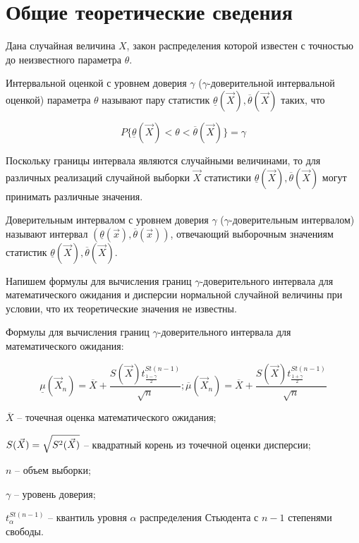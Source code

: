 \documentclass[12pt]{report}
\begin{document}
\clearpage

\chapter*{Общие теоретические сведения}

Дана случайная величина $X$, закон распределения которой известен с точностью до неизвестного параметра $\theta$.

Интервальной оценкой с уровнем доверия $\gamma$ ($\gamma$-доверительной интервальной оценкой) параметра $\theta$ называют пару статистик $\underline{\theta}(\vec X), \overline{\theta}(\vec X)$ таких, что

\begin{equation*}
	P\{\underline{\theta}(\vec X)<\theta<\overline{\theta}(\vec X)\}=\gamma
\end{equation*}

Поскольку границы интервала являются случайными величинами, то для различных реализаций случайной выборки $\vec X$ статистики $\underline{\theta}(\vec X), \overline{\theta}(\vec X)$ могут принимать различные значения.

Доверительным интервалом с уровнем доверия $\gamma$ ($\gamma$-доверительным интервалом) называют интервал $(\underline{\theta}(\vec x), \overline{\theta}(\vec x))$, отвечающий выборочным значениям статистик $\underline{\theta}(\vec X), \overline{\theta}(\vec X)$.

Напишем формулы для вычисления границ $\gamma$-доверительного интервала для 
математического ожидания и дисперсии нормальной случайной величины при условии, что 
их теоретические значения не известны.

Формулы для вычисления границ $\gamma$-доверительного интервала для математического ожидания:

\begin{equation}
	\underline\mu(\vec X_n)=\overline X + \frac{S(\vec X)t^{St(n-1)}_{\frac{1-\gamma}{2}}}{\sqrt{n}}; \overline\mu(\vec X_n)=\overline X + \frac{S(\vec X)t^{St(n-1)}_{\frac{1+\gamma}{2}}}{\sqrt{n}}
\end{equation}


$\overline X$ -- точечная оценка математического ожидания;

$S(\vec X) = \sqrtsign{S^2(\vec X)}$ -- квадратный корень из точечной оценки дисперсии;

$n$ -- объем выборки;

$\gamma$ -- уровень доверия;

$t^{St(n-1)}_{\alpha}$ -- квантиль уровня $\alpha$ распределения Стьюдента с $n - 1$ степенями свободы.
\end{document}
